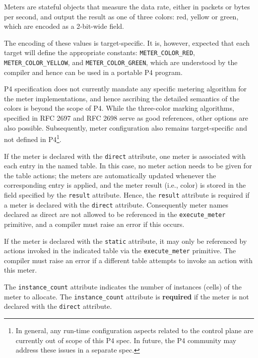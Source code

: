 \documentclass[12pt]{article}
\begin{document}
Meters are stateful objects that measure the data rate, either in 
packets or bytes per second, and output the result as one of three 
colors: red, yellow or green, which are encoded as a 2-bit-wide field.

The encoding of these values is target-specific. It is, however, 
expected that each target will define the appropriate constants: 
\texttt{METER_COLOR_RED}, \texttt{METER_COLOR_YELLOW},
and \texttt{METER_COLOR_GREEN}, which are understood by the compiler
and hence can be used in a portable P4 program.

P4 specification does not currently mandate any specific metering 
algorithm for the meter implementations, and hence ascribing the 
detailed semantics of the colors is beyond the scope of P4. While 
the three-color marking algorithms, specified in RFC 2697 and RFC 2698 
serve as good references, other options are also possible. Subsequently, 
meter configuration also remains target-specific and not defined 
in P4\footnote{In general, any run-time configuration aspects related 
to the control plane are currently out of scope of this P4 spec. In future, 
the P4 community may address these issues in a separate spec.}.

If the meter is declared with the \texttt{direct} attribute, one meter
is associated with each entry in the named table. In this case, no 
meter action needs to be given for the table actions; the meters are 
automatically updated whenever the corresponding entry is applied,
and the meter result (i.e., color) is stored in the field specified 
by the \texttt{result} attribute. Hence, the \texttt{result} attribute
is required if a meter is declared with the \texttt{direct} attribute.
Consequently meter names declared as direct are not allowed to be 
referenced in the \texttt{execute_meter} primitive, and a compiler must
raise an error if this occurs. 

If the meter is declared with the \texttt{static} attribute, it may only
be referenced by actions invoked in the indicated table via the \texttt{execute_meter}
primitive. The compiler must raise an error if a different table 
attempts to invoke an action with this meter.

The \texttt{instance_count} attribute indicates the number of
instances (cells) of the meter to allocate.  The
\texttt{instance_count} attribute is \textbf{required} if the meter
is not declared with the \texttt{direct} attribute.

\end{document}
